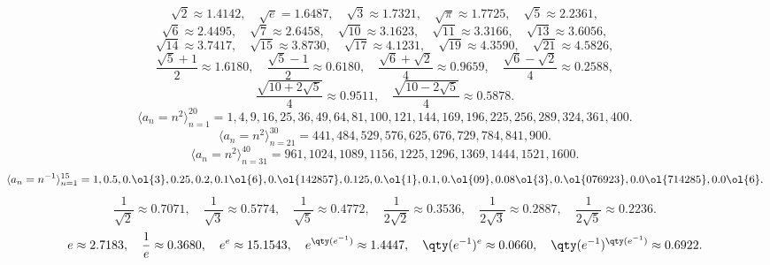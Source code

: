 \documentclass[a4paper,12pt]{article}
\begin{document}
\[\sqrt{2}\approx 1.4142,\quad\sqrt{e}=1.6487,\quad\sqrt{3}\approx 1.7321,\quad\sqrt{\pi}\approx 1.7725,\quad\sqrt{5}\approx 2.2361,\]
\[\sqrt{6}\approx 2.4495,\quad\sqrt{7}\approx 2.6458,\quad\sqrt{10}\approx 3.1623,\quad\sqrt{11}\approx 3.3166,\quad\sqrt{13}\approx 3.6056,\]
\[\sqrt{14}\approx 3.7417,\quad\sqrt{15}\approx 3.8730,\quad\sqrt{17}\approx 4.1231,\quad\sqrt{19}\approx 4.3590,\quad\sqrt{21}\approx 4.5826,\]
\[\frac{\sqrt{5}+1}{2}\approx 1.6180,\quad\frac{\sqrt{5}-1}{2}\approx 0.6180,\quad\frac{\sqrt{6}+\sqrt{2}}{4}\approx 0.9659,\quad\frac{\sqrt{6}-\sqrt{2}}{4}\approx 0.2588,\]
\[\frac{\sqrt{10+2\sqrt{5}}}{4}\approx 0.9511,\quad\frac{\sqrt{10-2\sqrt{5}}}{4}\approx 0.5878.\]
\[\langle a_n=n^2\rangle_{n=1}^{20}=1,4,9,16,25,36,49,64,81,100,121,144,169,196,225,256,289,324,361,400.\]
\[\langle a_n=n^2\rangle_{n=21}^{30}=441,484,529,576,625,676,729,784,841,900.\]
\[\langle a_n=n^2\rangle_{n=31}^{40}=961,1024,1089,1156,1225,1296,1369,1444,1521,1600.\]
\[\langle a_n=n^{-1}\rangle_{n=1}^{15}=1,0.5,0.\ol{3},0.25,0.2,0.1\ol{6},0.\ol{142857},0.125,0.\ol{1},0.1,0.\ol{09},0.08\ol{3},0.\ol{076923},0.0\ol{714285},0.0\ol{6}.\]
\[\frac{1}{\sqrt{2}}\approx 0.7071,\quad\frac{1}{\sqrt{3}}\approx 0.5774,\quad\frac{1}{\sqrt{5}}\approx 0.4772,\quad\frac{1}{2\sqrt{2}}\approx 0.3536,\quad\frac{1}{2\sqrt{3}}\approx 0.2887,\quad\frac{1}{2\sqrt{5}}\approx 0.2236.\]
\[e\approx 2.7183,\quad\frac{1}{e}\approx 0.3680,\quad e^e\approx 15.1543,\quad e^{\qty(e^{-1})}\approx 1.4447,\quad \qty(e^{-1})^e\approx 0.0660,\quad\qty(e^{-1})^{\qty(e^{-1})}\approx 0.6922.\]
\end{document}
